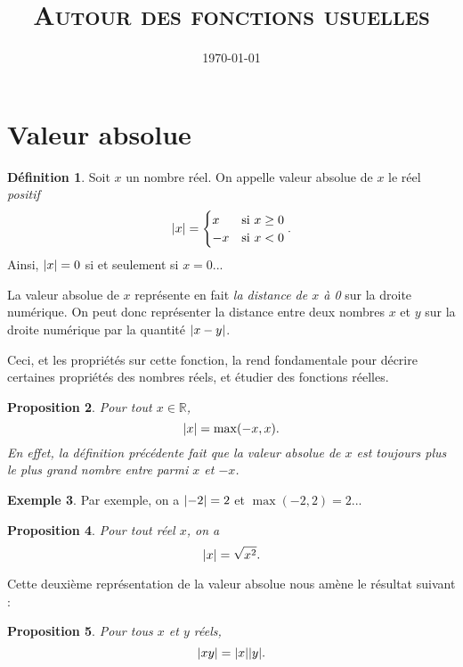 \documentclass{article}
\title{\textsc{Autour des fonctions usuelles}}
\author{}
\date{\today}
\theoremstyle{definition}
\newtheorem{mydef}{Définition}[section]
\newtheorem{exe}[mydef]{Exemple}
\theoremstyle{remark}
\theoremstyle{plain}
\newtheorem{prop}[mydef]{Proposition}
\newcommand{\R}{\mathbb R}
\DeclarePairedDelimiter{\abs}{\lvert}{\rvert}
\begin{document}
\maketitle

\section{Valeur absolue}

\begin{mydef}
Soit $x$ un nombre réel. On appelle valeur absolue de $x$ le réel \textit{positif}
\[
\abs{x} = \begin{cases}
x &\textrm{si }x\geq 0 \\
-x &\textrm{si }x<0
\end{cases}.
\]
Ainsi, $\abs x=0$ si et seulement si $x=0$... 
\end{mydef}

La valeur absolue de $x$ représente en fait \textit{la distance de $x$ à 0} sur la droite numérique. On peut donc représenter la distance entre deux nombres $x$ et $y$ sur la droite numérique par la quantité $\abs{x-y}$.

Ceci, et les propriétés sur cette fonction, la rend fondamentale pour décrire certaines propriétés des nombres réels, et étudier des fonctions réelles.

\begin{prop}\label{prop:absmax}
Pour tout $x\in\R$,
\begin{equation}
\abs{x} = \max(-x,x).
\end{equation}
En effet, la définition précédente fait que la valeur absolue de $x$ est toujours plus le plus grand nombre entre parmi $x$ et $-x$.
\end{prop}

\begin{exe}
Par exemple, on a $\abs{-2} = 2$ et $\max(-2,2) = 2$...
\end{exe}

\begin{prop}\label{prop:absroot}
Pour tout réel $x$, on a
\begin{equation}\abs x = \sqrt{x^2}.\end{equation}
\end{prop}

Cette deuxième représentation de la valeur absolue nous amène le résultat suivant :

\begin{prop}\label{prop:absmult}
Pour tous $x$ et $y$ réels,
\begin{equation}\abs{xy} = \abs x \abs y.\end{equation}
\end{prop}
\end{document}
